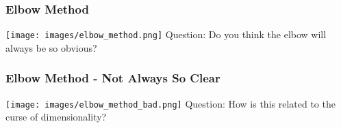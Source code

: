 \documentclass{beamer}
\begin{document}
\begin{frame}
  \frametitle{Elbow Method}
  \texttt{[image: images/elbow\_method.png]} \vspace{2mm} \pause
  \centering
  Question: Do you think the elbow will always be so obvious?
\end{frame}

\begin{frame}
  \frametitle{Elbow Method - Not Always So Clear}
  \texttt{[image: images/elbow\_method\_bad.png]} \vspace{2mm} \pause
  \centering
  Question: How is this related to the curse of dimensionality?
\end{frame}
\end{document}
